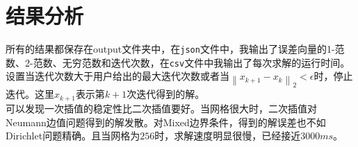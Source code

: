 \documentclass[UTF8]{ctexart}
\begin{document}
	\section{结果分析}
	所有的结果都保存在output文件夹中，在\texttt{json}文件中，我输出了误差向量的1-范数、2-范数、无穷范数和迭代次数，在\texttt{csv}文件中我输出了每次求解的运行时间。\\
	设置当迭代次数大于用户给出的最大迭代次数或者当$\left \| x_{k+1}-x_k \right \|_2 < \epsilon$时，停止迭代。这里$x_{k+1}$表示第$k+1$次迭代得到的解。\\
	可以发现一次插值的稳定性比二次插值要好。当网格很大时，二次插值对Neumann边值问题得到的解发散。对Mixed边界条件，得到的解误差也不如Dirichlet问题精确。且当网格为$256$时，求解速度明显很慢，已经接近$3000 ms$。
\end{document}
